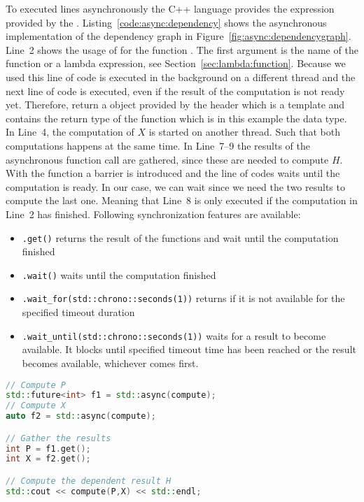 To executed lines asynchronously the C++ language provides the  expression provided by the . Listing~\ref{code:async:dependency} shows the asynchronous implementation of the dependency graph in Figure~\ref{fig:async:dependencygraph}. Line~2 shows the usage of  for the function . The first argument is the name of the function or a lambda expression, see Section~\ref{sec:lambda:function}. Because we used  this line of code is executed in the background on a different thread and the next line of code is executed, even if the result of the computation is not ready yet. Therefore,  return a  object provided by the  header which is a template and contains the return type of the function which is in this example the  data type. In Line~4, the computation of $X$ is started on another thread. Such that both computations happens at the same time. In Line~7--9 the results of the asynchronous function call are gathered, since these are needed to compute $H$. With the  function a barrier is introduced and the line of codes waits until the computation is ready. In our case, we can wait since we need the two results to compute the last one. Meaning that Line~8 is only executed if the computation in Line~2 has finished. Following synchronization features are available:
\begin{itemize}
\item \lstinline|.get()| returns the result of the functions and wait until the computation finished
\item \lstinline|.wait()| waits until the computation finished
\item \lstinline|.wait_for(std::chrono::seconds(1))| returns if it is not available for the specified timeout duration 
\item \lstinline|.wait_until(std::chrono::seconds(1))| waits for a result to become available. It blocks until specified timeout time has been reached or the result becomes available, whichever comes first. 
\end{itemize}

\begin{lstlisting}[language=c++,caption={Asynchronous execution of the dependency graph.\label{code:async:dependency}},float,floatplacement=tb]
// Compute P
std::future<int> f1 = std::async(compute);
// Compute X
auto f2 = std::async(compute);

// Gather the results
int P = f1.get();
int X = f2.get();

// Compute the dependent result H
std::cout << compute(P,X) << std::endl;
\end{lstlisting}

